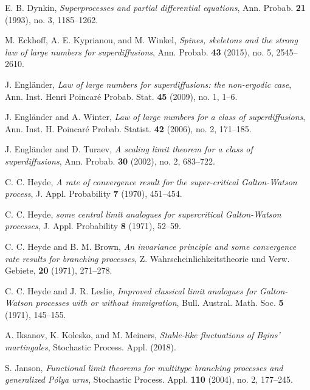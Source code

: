 \documentclass[12pt,a4paper]{amsart}
\theoremstyle{plain}
\theoremstyle{definition}
\numberwithin{equation}{section}
\begin{document}
\begin{thebibliography}{10}
  E. B. Dynkin, 
  \emph{Superprocesses and partial differential equations}, 
  Ann. Probab. \textbf{21} (1993), no. 3, 1185--1262.

  M. Eckhoff, A. E. Kyprianou, and M. Winkel, 
  \emph{Spines, skeletons and the strong law of large numbers for superdiffusions}, 
  Ann. Probab. \textbf{43} (2015), no. 5, 2545--2610.

  J. Engl\"{a}nder, 
  \emph{Law of large numbers for superdiffusions: the non-ergodic case}, 
  Ann. Inst. Henri Poincar\'{e} Probab. Stat. \textbf{45} (2009), no. 1, 1--6.

  J. Engl\"{a}nder and A. Winter, 
  \emph{Law of large numbers for a class of superdiffusions}, 
  Ann. Inst. H. Poincar\'{e} Probab. Statist. \textbf{42} (2006), no. 2, 171--185.

  J. Engl\"{a}nder and  D. Turaev, 
  \emph{A scaling limit theorem for a class of superdiffusions}, 
  Ann. Probab. \textbf{30} (2002), no. 2, 683--722.

  C. C. Heyde, 
  \emph{A rate of convergence result for the super-critical {G}alton-{W}atson process}, 
  J. Appl. Probability \textbf{7} (1970), 451--454.

  C. C. Heyde, 
  \emph{some central limit analogues for supercritical {G}alton-{W}atson processes}, 
  J. Appl. Probability \textbf{8} (1971), 52--59.

  C. C. Heyde and B. M. Brown, 
  \emph{An invariance principle and some convergence rate results for branching processes}, 
  Z. Wahrscheinlichkeitstheorie und Verw. Gebiete, \textbf{20} (1971), 271--278.

  C. C. Heyde and J. R. Leslie, 
  \emph{Improved classical limit analogues for {G}alton-{W}atson processes with or without immigration}, 
  Bull. Austral. Math. Soc. \textbf{5} (1971), 145--155.

  A. Iksanov, K. Kolesko, and M. Meiners, 
  \emph{Stable-like fluctuations of {B}gins' martingales}, 
  Stochastic Process. Appl. (2018).

  S. Janson, 
  \emph{Functional limit theorems for multitype branching processes and generalized {P}\'{o}lya urns}, 
  Stochastic Process. Appl. \textbf{110} (2004), no. 2, 177--245.


\end{thebibliography}
\end{document}
